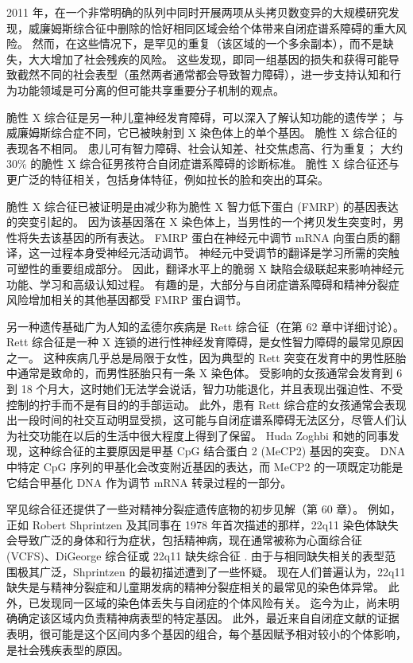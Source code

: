 2011 年，在一个非常明确的队列中同时开展两项从头拷贝数变异的大规模研究发现，威廉姆斯综合征中删除的恰好相同区域会给个体带来自闭症谱系障碍的重大风险。 
然而，在这些情况下，是罕见的重复（该区域的一个多余副本），而不是缺失，大大增加了社会残疾的风险。 
这些发现，即同一组基因的损失和获得可能导致截然不同的社会表型（虽然两者通常都会导致智力障碍），进一步支持认知和行为功能领域是可分离的但可能共享重要分子机制的观点。


脆性 X 综合征是另一种儿童神经发育障碍，可以深入了解认知功能的遗传学； 与威廉姆斯综合症不同，它已被映射到 X 染色体上的单个基因。 
脆性 X 综合征的表现各不相同。 
患儿可有智力障碍、社会认知差、社交焦虑高、行为重复； 
大约 30\% 的脆性 X 综合征男孩符合自闭症谱系障碍的诊断标准。 
脆性 X 综合征还与更广泛的特征相关，包括身体特征，例如拉长的脸和突出的耳朵。


脆性 X 综合征已被证明是由减少称为脆性 X 智力低下蛋白 (FMRP) 的基因表达的突变引起的。 
因为该基因落在 X 染色体上，当男性的一个拷贝发生突变时，男性将失去该基因的所有表达。 
FMRP 蛋白在神经元中调节 mRNA 向蛋白质的翻译，这一过程本身受神经元活动调节。 
神经元中受调节的翻译是学习所需的突触可塑性的重要组成部分。 
因此，翻译水平上的脆弱 X 缺陷会级联起来影响神经元功能、学习和高级认知过程。 
有趣的是，大部分与自闭症谱系障碍和精神分裂症风险增加相关的其他基因都受 FMRP 蛋白调节。


另一种遗传基础广为人知的孟德尔疾病是 Rett 综合征（在第 62 章中详细讨论）。 
Rett 综合征是一种 X 连锁的进行性神经发育障碍，是女性智力障碍的最常见原因之一。 
这种疾病几乎总是局限于女性，因为典型的 Rett 突变在发育中的男性胚胎中通常是致命的，而男性胚胎只有一条 X 染色体。 
受影响的女孩通常会发育到 6 到 18 个月大，这时她们无法学会说话，智力功能退化，并且表现出强迫性、不受控制的拧手而不是有目的的手部运动。 
此外，患有 Rett 综合症的女孩通常会表现出一段时间的社交互动明显受损，这可能与自闭症谱系障碍无法区分，尽管人们认为社交功能在以后的生活中很大程度上得到了保留。 
Huda Zoghbi 和她的同事发现，这种综合征的主要原因是甲基 CpG 结合蛋白 2 (MeCP2) 基因的突变。 
DNA 中特定 CpG 序列的甲基化会改变附近基因的表达，而 MeCP2 的一项既定功能是它结合甲基化 DNA 作为调节 mRNA 转录过程的一部分。


罕见综合征还提供了一些对精神分裂症遗传底物的初步见解（第 60 章）。 
例如，正如 Robert Shprintzen 及其同事在 1978 年首次描述的那样，22q11 染色体缺失会导致广泛的身体和行为症状，包括精神病，现在通常被称为心面综合征 (VCFS)、DiGeorge 综合征或 22q11 缺失综合征 . 由于与相同缺失相关的表型范围极其广泛，Shprintzen 的最初描述遭到了一些怀疑。 
现在人们普遍认为，22q11 缺失是与精神分裂症和儿童期发病的精神分裂症相关的最常见的染色体异常。 
此外，已发现同一区域的染色体丢失与自闭症的个体风险有关。 
迄今为止，尚未明确确定该区域内负责精神病表型的特定基因。 
此外，最近来自自闭症文献的证据表明，很可能是这个区间内多个基因的组合，每个基因赋予相对较小的个体影响，是社会残疾表型的原因。



